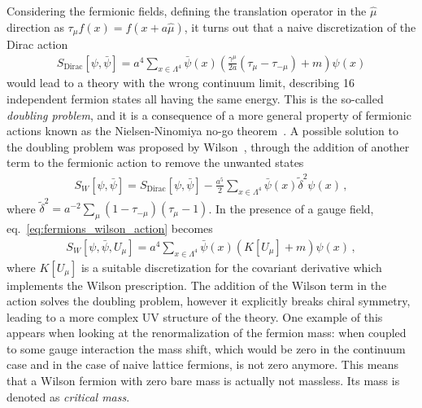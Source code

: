 %
Considering the fermionic fields, defining the translation operator in the $\hat{\mu}$ direction as 
$\tau_{\mu}f\left(x\right) = f\left(x+a\hat{\mu}\right)$, 
it turns out that a naive discretization of the Dirac action
\begin{align}
    \label{eq:naive_Dirac}
    S_{\text{Dirac}}\left[\psi,\bar{\psi}\right] = 
    a^4\sum_{x\in\Lambda^4}\bar{\psi}\left(x\right)\left(\frac{\gamma^{\mu}}{2a}\left(\tau_{\mu}-\tau_{-\mu}\right) + m\right) \psi\left(x\right)
\end{align}
would lead to a theory with the wrong continuum limit, describing 16 independent fermion states all having the same energy.
This is the so-called \textit{doubling problem}, and it is a consequence of a more general property of 
fermionic actions known as the Nielsen-Ninomiya no-go theorem~\cite{Nielsen:1981hk}.
A possible solution to the doubling problem was proposed by Wilson~\cite{PhysRevD.10.2445}, 
through the addition of another term to the fermionic action
to remove the unwanted states
\begin{align}
    \label{eq:fermions_wilson_action}
    S_W\left[\psi,\bar{\psi}\right] = S_{\text{Dirac}}\left[\psi,\bar{\psi}\right] 
    - \frac{a^5}{2}\sum_{x\in\Lambda^4}\bar{\psi}\left(x\right)\tilde{\delta}^2 \psi\left(x\right)\,,
\end{align}
where $\tilde{\delta}^2 = a^{-2}\sum_{\mu}\left(1-\tau_{-\mu}\right)\left(\tau_{\mu}-1\right)$.
In the presence of a gauge field, eq.~\eqref{eq:fermions_wilson_action} becomes 
\begin{align}
    S_W\left[\psi,\bar{\psi}, U_{\mu}\right] = a^4\sum_{x\in\Lambda^4}\bar{\psi}\left(x\right)\left(K\left[U_{\mu}\right] + m\right)\psi\left(x\right)\,,
\end{align}
where $K\left[U_{\mu}\right]$ is a suitable discretization for the covariant derivative which implements
the Wilson prescription. 
The addition of the Wilson term in the action solves the doubling problem, however it explicitly breaks
chiral symmetry, leading to a more complex UV structure of the theory. 
One example of this appears when looking at the renormalization of the fermion mass:
when coupled to some gauge interaction the mass shift, which would be zero in the continuum case and in the case 
of naive lattice fermions, is not zero anymore. This means that a Wilson fermion with zero bare mass is actually not massless.
Its mass is denoted as \textit{critical mass}.


